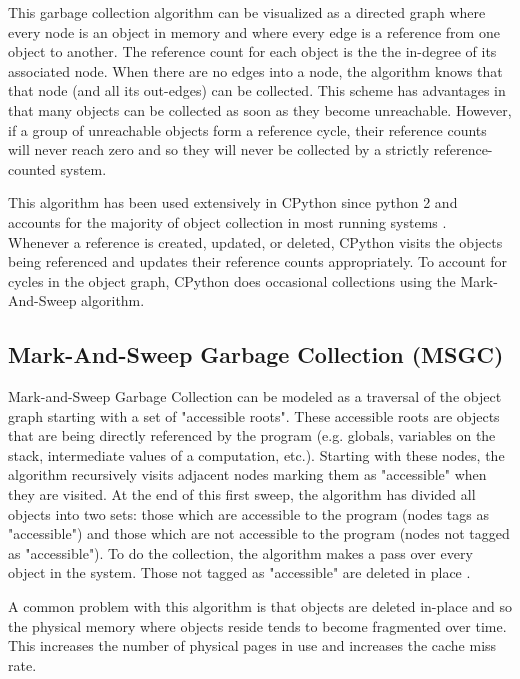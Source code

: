 \documentclass{article}
\begin{document}
This garbage collection algorithm can be visualized as a directed graph where every node is an object in memory and where every edge is a reference from one object to another.  The reference count for each object is the the in-degree of its associated node.  When there are no edges into a node, the algorithm knows that that node (and all its out-edges) can be collected.  This scheme has advantages in that many objects can be collected as soon as they become unreachable.  However, if a group of unreachable objects form a reference cycle, their reference counts will never reach zero and so they will never be collected by a strictly reference-counted system.  

This algorithm has been used extensively in CPython since python 2 and accounts for the majority of object collection in most running systems \cite{cpython3-doc}.  Whenever a reference is created, updated, or deleted, CPython visits the objects being referenced and updates their reference counts appropriately.  To account for cycles in the object graph, CPython does occasional collections using the Mark-And-Sweep algorithm.  

\subsection{Mark-And-Sweep Garbage Collection (MSGC)}\label{sec:MSGC}

Mark-and-Sweep Garbage Collection can be modeled as a traversal of the object graph starting with a set of "accessible roots".  These accessible roots are objects that are being directly referenced by the program (e.g. globals, variables on the stack, intermediate values of a computation, etc.).  Starting with these nodes, the algorithm recursively visits adjacent nodes marking them as "accessible" when they are visited.  At the end of this first sweep, the algorithm has divided all objects into two sets: those which are accessible to the program (nodes tags as "accessible") and those which are not accessible to the program (nodes not tagged as "accessible").  To do the collection, the algorithm makes a pass over every object in the system.  Those not tagged as "accessible" are deleted in place \cite{GC-continuum}. 

A common problem with this algorithm is that objects are deleted in-place and so the physical memory where objects reside tends to become fragmented over time.  This increases the number of physical pages in use and increases the cache miss rate.  
\end{document}
